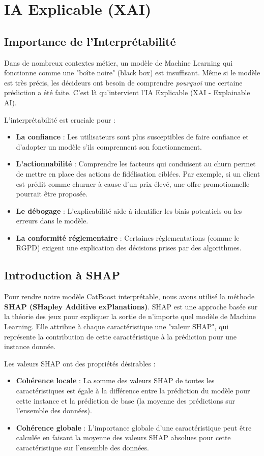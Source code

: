 \chapter{IA Explicable (XAI)}

\section{Importance de l'Interprétabilité}
Dans de nombreux contextes métier, un modèle de Machine Learning qui fonctionne comme une "boîte noire" (black box) est insuffisant. Même si le modèle est très précis, les décideurs ont besoin de comprendre \textit{pourquoi} une certaine prédiction a été faite. C'est là qu'intervient l'IA Explicable (XAI - Explainable AI).

L'interprétabilité est cruciale pour :
\begin{itemize}
    \item \textbf{La confiance} : Les utilisateurs sont plus susceptibles de faire confiance et d'adopter un modèle s'ils comprennent son fonctionnement.
    \item \textbf{L'actionnabilité} : Comprendre les facteurs qui conduisent au churn permet de mettre en place des actions de fidélisation ciblées. Par exemple, si un client est prédit comme churner à cause d'un prix élevé, une offre promotionnelle pourrait être proposée.
    \item \textbf{Le débogage} : L'explicabilité aide à identifier les biais potentiels ou les erreurs dans le modèle.
    \item \textbf{La conformité réglementaire} : Certaines réglementations (comme le RGPD) exigent une explication des décisions prises par des algorithmes.
\end{itemize}

\section{Introduction à SHAP}
Pour rendre notre modèle CatBoost interprétable, nous avons utilisé la méthode \textbf{SHAP (SHapley Additive exPlanations)}. SHAP est une approche basée sur la théorie des jeux pour expliquer la sortie de n'importe quel modèle de Machine Learning. Elle attribue à chaque caractéristique une "valeur SHAP", qui représente la contribution de cette caractéristique à la prédiction pour une instance donnée.

Les valeurs SHAP ont des propriétés désirables :
\begin{itemize}
    \item \textbf{Cohérence locale} : La somme des valeurs SHAP de toutes les caractéristiques est égale à la différence entre la prédiction du modèle pour cette instance et la prédiction de base (la moyenne des prédictions sur l'ensemble des données).
    \item \textbf{Cohérence globale} : L'importance globale d'une caractéristique peut être calculée en faisant la moyenne des valeurs SHAP absolues pour cette caractéristique sur l'ensemble des données.
\end{itemize}

